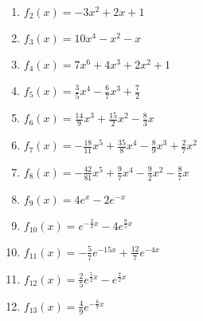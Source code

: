 \begin{minipage}{\textwidth}
{\begin{minipage}{.5\textwidth-4ex}
\begin{Exercise}[title={\raggedright Bestimme jeweils alle Stammfunktionen.}, label=stammfunktionenA2]
\begin{enumerate}[label=\alph*)]
				\item \(f_2(x)=-3x^2+2x+1\)
				\item \(f_3(x)=10x^4-x^2-x\)
				\item \(f_4(x)=7x^6+4x^3+2x^2+1\)
				\item \(f_5(x)=\frac{3}{5}x^4-\frac{6}{7}x^3+\frac{7}{2}\)
				\item \(f_6(x)=\frac{14}{9}x^3+\frac{15}{2}x^2-\frac{8}{3}x\)
				\item \(f_7(x)=-\frac{18}{11}x^5+\frac{35}{8}x^4-\frac{8}{9}x^3+\frac{2}{7}x^2\)
				\item \(f_8(x)=-\frac{42}{81}x^5+\frac{9}{7}x^4-\frac{9}{2}x^2-\frac{8}{7}x\)
				\item \(f_9(x)=4e^x-2e^{-x}\)
				\item \(f_{10}(x)=e^{-\frac{2}{3}x}-4e^{\frac{9}{5}x}\)
				\item \(f_{11}(x)=-\frac{5}{7}e^{-15x}+\frac{12}{7}e^{-4x}\)
				\item \(f_{12}(x)=\frac{2}{5}e^{\frac{5}{2}x}-e^{\frac{7}{2}x}\)
				\item \(f_{13}(x)=\frac{4}{9}e^{-\frac{6}{7}x}\)
			\end{enumerate}
		\end{Exercise}
	\end{minipage}}%
\end{minipage}

